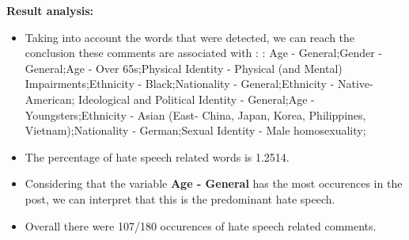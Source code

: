 \documentclass[11pt]{article}
\newlength\mylength
\begin{document}
\begin{center}
\begin{longtable}{|C{.50\mylength}|C{.30\mylength}|C{.15\mylength}|C{.15\mylength}|C{.15\mylength}|}
\end{longtable}
\end{center}


\textbf{\Large Result analysis:}

\begin{itemize}\item Taking into account the words that were detected, we can reach the conclusion these comments are associated with : : Age - General;Gender - General;Age - Over 65s;Physical Identity - Physical (and Mental) Impairments;Ethnicity - Black;Nationality - General;Ethnicity - Native-American; Ideological and Political Identity - General;Age - Youngsters;Ethnicity - Asian (East- China, Japan, Korea, Philippines, Vietnam);Nationality - German;Sexual Identity - Male homosexuality;%

\item The percentage of hate speech related words is 1.2514.

\item Considering that the variable \textbf{Age - General} has the most occurences in the post, we can interpret that this is the predominant hate speech.

\item Overall there were 107/180 occurences of hate speech related comments.\end{itemize}
\end{document}
